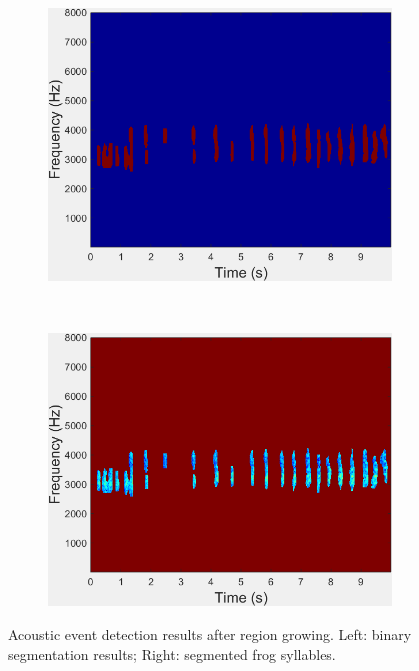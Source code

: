\begin{figure}[htb!]
\centering
        \begin{subfigure}[b]{0.45\textwidth}
                \includegraphics[width=\textwidth]{image/Ch6/binary.png}
        \end{subfigure}
       ~
              \begin{subfigure}[b]{0.45\textwidth}
                \includegraphics[width=\textwidth]{image/Ch6/segmentEvents.png}                
        \end{subfigure}       
\caption{Acoustic event detection results after region growing. Left: binary segmentation results; Right: segmented frog syllables.}
        \label{fig:Ch6_AED}
\end{figure}



